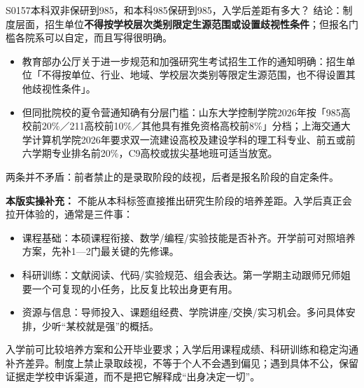 \begin{qa}{S0157}{本科双非保研到985，和本科985保研到985，入学后差距有多大？}
结论：制度层面，招生单位\textbf{不得按学校层次类别限定生源范围或设置歧视性条件}；但报名门槛各院系可以自定，而且写得很明确。

\begin{itemize}
  \item 教育部办公厅关于进一步规范和加强研究生考试招生工作的通知明确：招生单位「不得按单位、行业、地域、学校层次类别等限定生源范围，也不得设置其他歧视性条件」。
  \item 但同批院校的夏令营通知确有分层门槛：山东大学控制学院2026年按「985高校前20\%／211高校前10\%／其他具有推免资格高校前8\%」分档；上海交通大学计算机学院2026年要求双一流建设高校及建设学科的理工科专业、前五或前六学期专业排名前20\%，C9高校或拔尖基地班可适当放宽。
\end{itemize}

两条并不矛盾：前者禁止的是录取阶段的歧视，后者是报名阶段的自定条件。
\par\textbf{本版实操补充：} 不能从本科标签直接推出研究生阶段的培养差距。入学后真正会拉开体验的，通常是三件事：

\begin{itemize}
  \item 课程基础：本硕课程衔接、数学/编程/实验技能是否补齐。开学前可对照培养方案，先补1—2门最关键的先修课。
  \item 科研训练：文献阅读、代码/实验规范、组会表达。第一学期主动跟师兄师姐要一个可复现的小任务，比反复比较出身更有用。
  \item 资源与信息：导师投入、课题组经费、学院讲座/交换/实习机会。多问具体安排，少听“某校就是强”的概括。
\end{itemize}

入学前可比较培养方案和公开毕业要求；入学后用课程成绩、科研训练和稳定沟通补齐差异。制度上禁止录取歧视，不等于个人不会遇到偏见；遇到具体不公，保留证据走学校申诉渠道，而不是把它解释成“出身决定一切”。
\end{qa}

